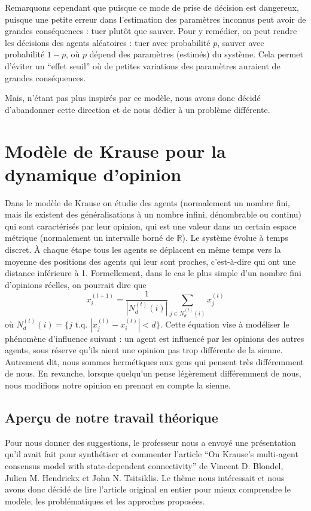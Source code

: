 \documentclass[a4paper,10pt]{article}
\begin{document}
Remarquons cependant que puisque ce mode de prise de décision est dangereux, puisque une petite erreur dans l'estimation des paramètres inconnus peut avoir de grandes conséquences : tuer plutôt que sauver. Pour y remédier, on peut rendre les décisions des agents aléatoires : tuer avec probabilité $p$, sauver avec probabilité $1-p$, où $p$ dépend des paramètres (estimés) du système. Cela permet d'éviter un ``effet seuil'' où de petites variations des paramètres auraient de grandes conséquences.

Mais, n'étant pas plus inspirés par ce modèle, nous avons donc décidé d'abandonner cette direction et de nous dédier à un problème différente.

\section{Modèle de Krause pour la dynamique d'opinion}

Dans le modèle de Krause on étudie des agents (normalement un nombre fini, mais ils existent des généralisations à un nombre infini, dénombrable ou continu) qui sont caractérisés par leur opinion, qui est une valeur dans un certain espace métrique (normalement un intervalle borné de $\mathbb{R}$). Le système évolue à temps discret. À chaque étape tous les agents se déplacent en même temps vers la moyenne des positions des agents qui leur sont proches, c'est-à-dire qui ont une distance inférieure à 1. Formellement, dans le cas le plus simple d'un nombre fini d'opinions réelles, on pourrait dire que
\begin{equation}
x_i^{(t+1)} = \frac{1}{|N_d^{(t)}(i)|} \sum_{j \in N_d^{(t)}(i)} x_j^{(t)}
\end{equation}
où $N_d^{(t)}(i) = \{j \text{ t.q. } |x_j^{(t)} - x_i^{(t)}| < d\}$.
Cette équation vise à modéliser le phénomène d'influence suivant : un agent est influencé par les opinions des autres agents, sous réserve qu'ils aient une opinion pas trop différente de la sienne. Autrement dit, nous sommes hermétiques aux gens qui pensent très différemment de nous. En revanche, lorsque quelqu'un pense légèrement différemment de nous, nous modifions notre opinion en prenant en compte la sienne.

\subsection{Aperçu de notre travail théorique}

Pour nous donner des suggestions, le professeur nous a envoyé une présenta\-tion qu'il avait fait pour synthétiser et commenter l'article ``On Krause’s multi-agent consensus model with state-dependent connectivity'' de Vincent D. Blondel, Julien M. Hendrickx et John N. Tsitsiklis. Le thème nous intéressait et nous avons donc décidé de lire l'article original en entier pour mieux comprendre le modèle, les problématiques et les approches proposées.
\end{document}
